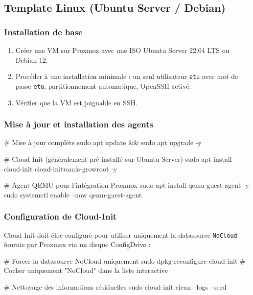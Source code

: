 \documentclass[a4paper]{article}
\newcommand{\cmd}[1]{\texttt{#1}}
\begin{document}
\subsection{Template Linux (Ubuntu Server / Debian)}

\subsubsection*{Installation de base}

\begin{enumerate}
  \item Créer une VM sur Proxmox avec une ISO Ubuntu Server 22.04 LTS ou Debian 12.
  \item Procéder à une installation minimale : un seul utilisateur \cmd{etu} avec mot de passe \cmd{etu}, partitionnement automatique, OpenSSH activé.
  \item Vérifier que la VM est joignable en SSH.
\end{enumerate}

\subsubsection*{Mise à jour et installation des agents}

\begin{bashcode}
# Mise à jour complète
sudo apt update && sudo apt upgrade -y

# Cloud-Init (généralement pré-installé sur Ubuntu Server)
sudo apt install cloud-init cloud-initramfs-growroot -y

# Agent QEMU pour l'intégration Proxmox
sudo apt install qemu-guest-agent -y
sudo systemctl enable --now qemu-guest-agent
\end{bashcode}

\subsubsection*{Configuration de Cloud-Init}

Cloud-Init doit être configuré pour utiliser uniquement la datasource \cmd{NoCloud} fournie par Proxmox via un disque ConfigDrive :

\begin{bashcode}
# Forcer la datasource NoCloud uniquement
sudo dpkg-reconfigure cloud-init
# Cocher uniquement "NoCloud" dans la liste interactive

# Nettoyage des informations résiduelles
sudo cloud-init clean --logs --seed
\end{bashcode}
\end{document}
